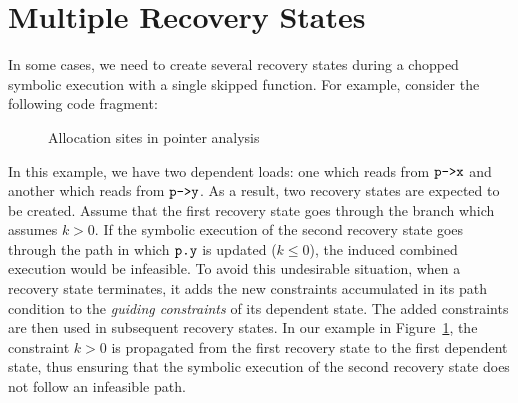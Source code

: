 
\section{Multiple Recovery States}
\label{Se:MultiRecovery}
In some cases, we need to create several recovery states during a
chopped symbolic execution with a single skipped function.
For example, consider the following code fragment:

\begin{figure}
  \captionsetup[subfloat]{labelformat=empty}
  \subfloat[]{
    
  }
  \caption{Allocation sites in pointer analysis}
  \label{fig:multiple-recovery-states}
\end{figure}

In this example, we have two dependent loads:
one which reads from $\texttt{p->x}$ and another which reads from $\texttt{p->y}$.
As a result, two recovery states are expected to be created.
Assume that the first recovery state goes through the branch which assumes $k > 0$.
If the symbolic execution of the second recovery state goes through the path in which
$\texttt{p.y}$ is updated ($k\le0$), the induced combined execution
would be infeasible. To avoid this undesirable situation, when a
recovery state terminates, it adds the new constraints accumulated in
its path condition to the \textit{guiding constraints} of its dependent state. The added
constraints are then used in subsequent recovery states. In our
example in Figure~\ref{fig:multiple-recovery-states}, the constraint $k > 0$ is
propagated from the first recovery state to the first dependent state,
thus ensuring that the symbolic execution of the second recovery state
does not follow an infeasible path.

